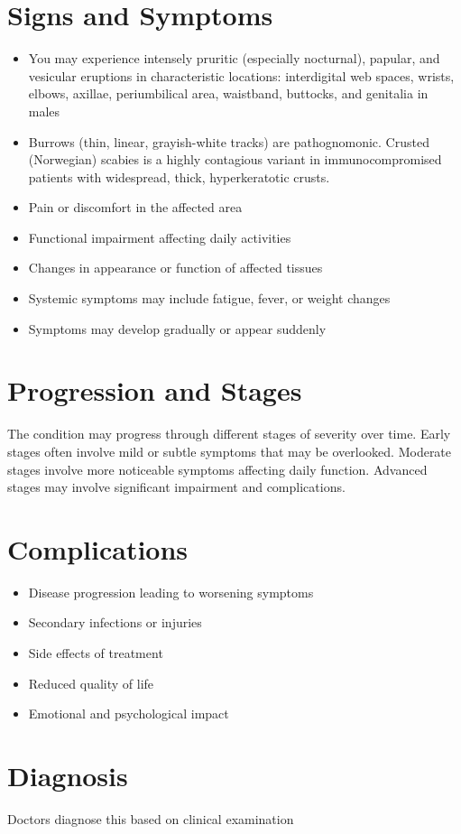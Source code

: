\section{Signs and Symptoms}
\begin{itemize}[noitemsep]
  \item You may experience intensely pruritic (especially nocturnal), papular, and vesicular eruptions in characteristic locations: interdigital web spaces, wrists, elbows, axillae, periumbilical area, waistband, buttocks, and genitalia in males
  \item Burrows (thin, linear, grayish-white tracks) are pathognomonic. Crusted (Norwegian) scabies is a highly contagious variant in immunocompromised patients with widespread, thick, hyperkeratotic crusts.
  \item Pain or discomfort in the affected area
  \item Functional impairment affecting daily activities
  \item Changes in appearance or function of affected tissues
  \item Systemic symptoms may include fatigue, fever, or weight changes
  \item Symptoms may develop gradually or appear suddenly
\end{itemize}
\section{Progression and Stages}
The condition may progress through different stages of severity over time. Early stages often involve mild or subtle symptoms that may be overlooked. Moderate stages involve more noticeable symptoms affecting daily function. Advanced stages may involve significant impairment and complications.
\section{Complications}
\begin{itemize}[noitemsep]
  \item Disease progression leading to worsening symptoms
  \item Secondary infections or injuries
  \item Side effects of treatment
  \item Reduced quality of life
  \item Emotional and psychological impact
\end{itemize}
\section{Diagnosis}
Doctors diagnose this based on clinical examination

